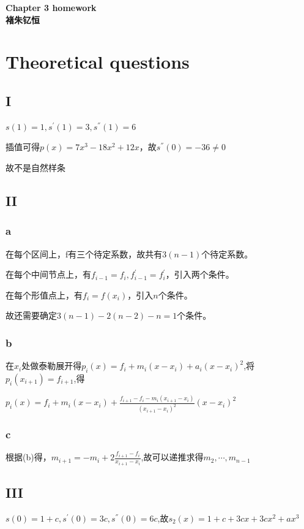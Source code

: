 \documentclass[12]{article}%
\begin{document}
\begin{center}
    \LARGE\songti\textbf{Chapter 3 homework} \\%
    \large\kaishu\textbf{褚朱钇恒}%
\end{center}
    \section{Theoretical questions}
        \subsection{I}
            $s(1)=1,s^{'}(1)=3,s^{''}(1)=6$

            插值可得$p(x)=7x^3-18x^2+12x$，故$s^{''}(0)=-36\neq 0$

            故不是自然样条
        \subsection{II}
            \subsubsection{a}
                在每个区间上，f有三个待定系数，故共有$3(n-1)$个待定系数。

                在每个中间节点上，有$f_{i-1}=f_i,f^{'}_{i-1}=f^{'}_i$，引入两个条件。

                在每个形值点上，有$f_i=f(x_i)$，引入$n$个条件。

                故还需要确定$3(n-1)-2(n-2)-n=1$个条件。

            \subsubsection{b}
                在$x_i$处做泰勒展开得$p_i(x)=f_i+m_i(x-x_i)+a_i(x-x_i)^2$,将$p_i(x_{i+1})=f_{i+1}$,得

                $p_i(x)=f_i+m_i(x-x_i)+\frac{f_{i+1}-f_i-m_i(x_{i+1}-x_i)}{(x_{i+1}-x_i)^2}(x-x_i)^2$
            
            \subsubsection{c}
                根据(b)得，$m_{i+1}=-m_i+2\frac{f_{i+1}-f_i}{x_{i+1}-x_i}$,故可以递推求得$m_2,\cdots,m_{n-1}$

        \subsection{III}
            $s(0)=1+c,s^{'}(0)=3c,s^{''}(0)=6c$,故$s_2(x)=1+c+3cx+3cx^2+ax^3$
\end{document}
